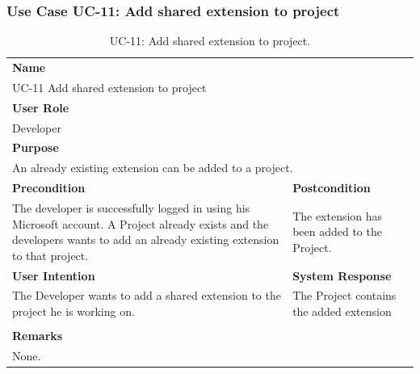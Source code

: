 \subsubsection{Use Case UC-11: Add shared extension to project}\label{subsubsec:use-case-uc-11:-add-shared-extension-to-project}

\begin{table}[H]
    \centering
    \begin{tabular}{|p{}|p{}|}

        \hline
        \multicolumn{2}{|l|}{\rowcolor{gray!50}\textbf{Name}} \\
        \multicolumn{2}{|l|}{UC-11 Add shared extension to project} \\ \hline

        \multicolumn{2}{|l|}{\rowcolor{gray!50}\textbf{User Role}} \\
        \multicolumn{2}{|l|}{Developer} \\ \hline

        \multicolumn{2}{|l|}{\rowcolor{gray!50}\textbf{Purpose}} \\
        \multicolumn{2}{|p{1\textwidth}|}{An already existing extension can be added to a project.} \\ \hline

        \rowcolor{gray!50}\textbf{Precondition} & \rowcolor{gray!50}\textbf{Postcondition} \\
        The developer is successfully logged in using his Microsoft account.
        A Project already exists and the developers wants to add an already existing extension to that project.
        &
        The extension has been added to the Project.\\ \hline

        \rowcolor{gray!50}\textbf{User Intention} & \rowcolor{gray!50}\textbf{System Response} \\
        The Developer wants to add a shared extension to the project he is working on.
        &
        The Project contains the added extension \\ \hline

        & \\ \hline

        \multicolumn{2}{|l|}{\rowcolor{gray!50}\textbf{Remarks}} \\
        \multicolumn{2}{|p{1\textwidth}|}{None.} \\ \hline
    \end{tabular}
    \caption{UC-11: Add shared extension to project.}
    \label{tab:uc-add-shared-extension-to-project}
\end{table}


